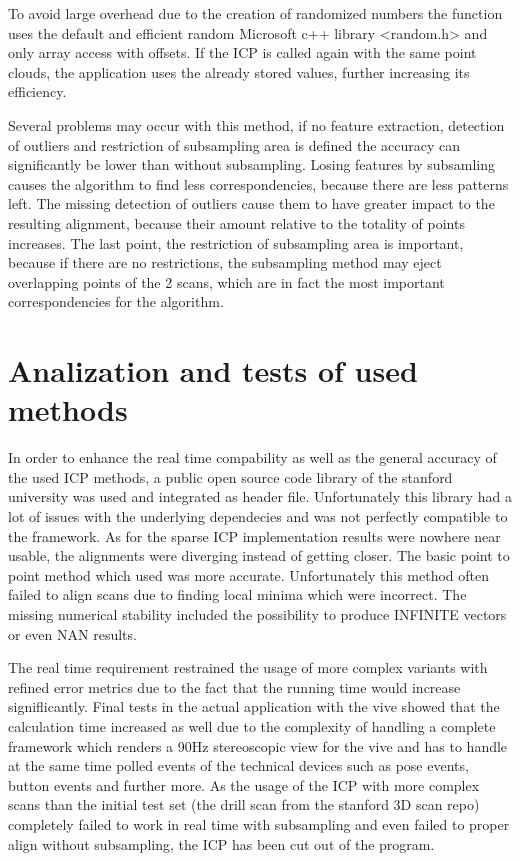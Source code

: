 \documentclass[hyperref,english,bachelorofscience,bibnum]{cgvpub}
\begin{document}
To avoid large overhead due to the creation of randomized numbers the function uses the default and efficient random Microsoft c++ library <random.h> and only array access with offsets. If the ICP is called again with the same point clouds, the application uses the already stored values, further increasing its efficiency.

Several problems may occur with this method, if no feature extraction, detection of outliers and restriction of subsampling area is defined the accuracy can significantly be lower than without subsampling. Losing features by subsamling causes the algorithm to find less correspondencies, because there are less patterns left. The missing detection of outliers cause them to have greater impact to the resulting alignment, because their amount relative to the totality of points increases. The last point, the restriction of subsampling area is important, because if there are no restrictions, the subsampling method may eject overlapping points of the 2 scans, which are in fact the most important correspondencies for the algorithm. 

\section{Analization and tests of used methods}

In order to enhance the real time compability as well as the general accuracy of the used ICP methods, a public open source code library of the stanford university was used and integrated as header file. Unfortunately this library had a lot of issues with the underlying dependecies and was not perfectly compatible to the framework. As for the sparse ICP implementation results were nowhere near usable, the alignments were diverging instead of getting closer. The basic point to point method which used %
was more accurate. Unfortunately this method often failed to align scans due to finding local minima which were incorrect. The missing numerical stability included the possibility to produce INFINITE vectors or even NAN results.

The real time requirement restrained the usage of more complex variants with refined error metrics due to the fact that the running time would increase signiflicantly. Final tests in the actual application with the vive showed that the calculation time increased as well due to the complexity of handling a complete framework which renders a 90Hz stereoscopic view for the vive and has to handle at the same time polled events of the technical devices such as pose events, button events and further more. As the usage of the ICP with more complex scans than the initial test set (the drill scan from the stanford 3D scan repo) completely failed to work in real time with subsampling and even failed to proper align without subsampling, the ICP has been cut out of the program.
\end{document}
